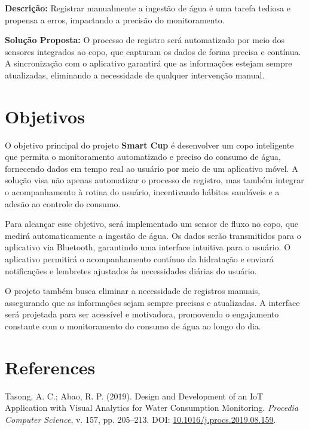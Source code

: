 \documentclass[12pt]{article}
\begin{document}
\textbf{Descrição:}  
Registrar manualmente a ingestão de água é uma tarefa tediosa e propensa a erros, impactando a precisão do monitoramento.

\textbf{Solução Proposta:}  
O processo de registro será automatizado por meio dos sensores integrados ao copo, que capturam os dados de forma precisa e contínua. A sincronização com o aplicativo garantirá que as informações estejam sempre atualizadas, eliminando a necessidade de qualquer intervenção manual.

\newpage

\section{Objetivos}

O objetivo principal do projeto \textbf{Smart Cup} é desenvolver um copo inteligente que permita o monitoramento automatizado e preciso do consumo de água, fornecendo dados em tempo real ao usuário por meio de um aplicativo móvel. A solução visa não apenas automatizar o processo de registro, mas também integrar o acompanhamento à rotina do usuário, incentivando hábitos saudáveis e a adesão ao controle do consumo.

Para alcançar esse objetivo, será implementado um sensor de fluxo no copo, que medirá automaticamente a ingestão de água. Os dados serão transmitidos para o aplicativo via Bluetooth, garantindo uma interface intuitiva para o usuário. O aplicativo permitirá o acompanhamento contínuo da hidratação e enviará notificações e lembretes ajustados às necessidades diárias do usuário.

O projeto também busca eliminar a necessidade de registros manuais, assegurando que as informações sejam sempre precisas e atualizadas. A interface será projetada para ser acessível e motivadora, promovendo o engajamento constante com o monitoramento do consumo de água ao longo do dia.








\newpage

\section{References}

\vspace{0.4cm}
\noindent
[1] Tasong, A. C.; Abao, R. P. (2019). Design and Development of an IoT Application with Visual Analytics for Water Consumption Monitoring. \emph{Procedia Computer Science}, v. 157, pp. 205–213. DOI: \href{https://doi.org/10.1016/j.procs.2019.08.159}{10.1016/j.procs.2019.08.159}.
\end{document}
